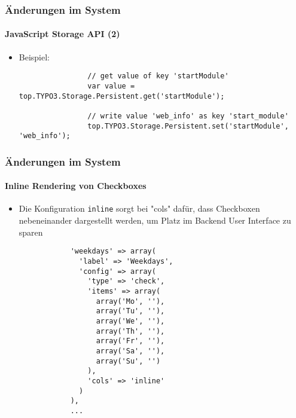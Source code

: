 \begin{frame}[fragile]
	\frametitle{Änderungen im System}
	\framesubtitle{JavaScript Storage API (2)}

	\begin{itemize}
		\item Beispiel:
			\begin{lstlisting}
				// get value of key 'startModule'
				var value = top.TYPO3.Storage.Persistent.get('startModule');

				// write value 'web_info' as key 'start_module'
				top.TYPO3.Storage.Persistent.set('startModule', 'web_info');
			\end{lstlisting}

	\end{itemize}

\end{frame}


\begin{frame}[fragile]
	\frametitle{Änderungen im System}
	\framesubtitle{Inline Rendering von Checkboxes}

	\lstset{basicstyle=\tiny\ttfamily}

	\begin{itemize}

		\item Die Konfiguration \texttt{inline} sorgt bei "cols" dafür, dass
			Checkboxen nebeneinander dargestellt werden, um Platz im
			Backend User Interface zu sparen

		\begin{lstlisting}
			'weekdays' => array(
			  'label' => 'Weekdays',
			  'config' => array(
			    'type' => 'check',
			    'items' => array(
			      array('Mo', ''),
			      array('Tu', ''),
			      array('We', ''),
			      array('Th', ''),
			      array('Fr', ''),
			      array('Sa', ''),
			      array('Su', '')
			    ),
			    'cols' => 'inline'
			  )
			),
			...
		\end{lstlisting}

	\end{itemize}

\end{frame}

